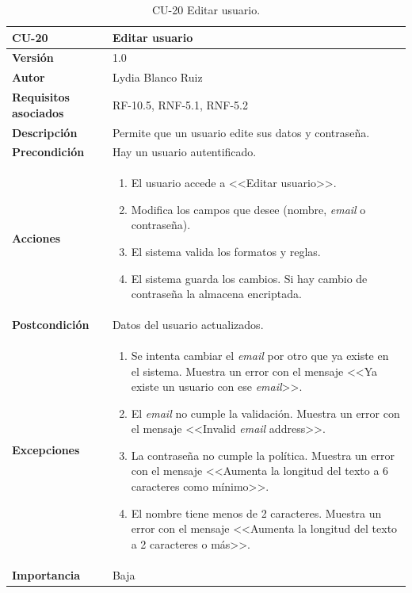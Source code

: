 \begin{table}[p]
	\centering
	\begin{tabularx}{\linewidth}{ p{} p{} }
		\toprule
		\textbf{CU-20}    & \textbf{ Editar usuario}\\
		\toprule
		\textbf{Versión}              & 1.0    \\
		\textbf{Autor}                & Lydia Blanco Ruiz \\
		\textbf{Requisitos asociados} & RF-10.5, RNF-5.1, RNF-5.2 \\
		\textbf{Descripción}          & Permite que un usuario edite sus datos y contraseña. \\
		\textbf{Precondición}         & Hay un usuario autentificado. \\
		\textbf{Acciones}             &
		\begin{enumerate}
			\def\labelenumi{\arabic{enumi}.}
			\tightlist
			\item El usuario accede a <<Editar usuario>>.
			\item Modifica los campos que desee (nombre, \textit{email} o contraseña).
			\item El sistema valida los formatos y reglas.
			\item El sistema guarda los cambios. Si hay cambio de contraseña la almacena encriptada.
		\end{enumerate}\\
		\textbf{Postcondición}        & Datos del usuario actualizados. \\
		\textbf{Excepciones}          & 
		\begin{enumerate}
			\def\labelenumi{\arabic{enumi}.}
			\tightlist
			\item Se intenta cambiar el \textit{email} por otro que ya existe en el sistema. Muestra un error con el mensaje <<Ya existe un usuario con ese \textit{email}>>.
			\item El \textit{email} no cumple la validación. Muestra un error con el mensaje <<Invalid \textit{email} address>>.
			\item La contraseña no cumple la política. Muestra un error con el mensaje <<Aumenta la longitud del texto a 6 caracteres como mínimo>>.
			\item El nombre tiene menos de 2 caracteres. Muestra un error con el mensaje <<Aumenta la longitud del texto a 2 caracteres o más>>.
		\end{enumerate}\\
		\textbf{Importancia}          & Baja  \\
		\bottomrule
	\end{tabularx}
	\caption{CU-20 Editar usuario.}
\end{table}



